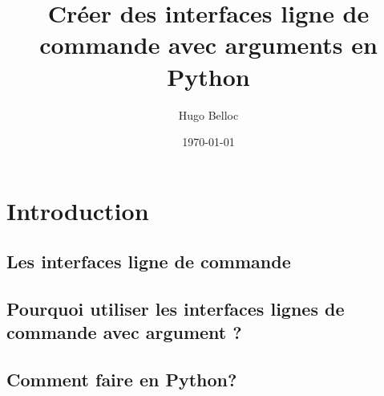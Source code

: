 \documentclass{beamer}
\title[Le module argparse]{Créer des interfaces ligne de commande avec arguments en Python}
\author{Hugo Belloc}
\date{\today}
\begin{document}
\begin{frame}
 \titlepage
\end{frame}

\begin{frame}
 \tableofcontents
\end{frame}

\section{Introduction}
\subsection{Les interfaces ligne de commande}

\subsection{Pourquoi utiliser les interfaces lignes de commande avec argument ?}

\subsection{Comment faire en Python?}
\end{document}
